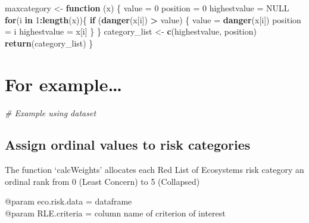 \documentclass[]{article}
\newenvironment{Shaded}{\begin{snugshade}}{\end{snugshade}}
\newcommand{\KeywordTok}[1]{\textcolor[rgb]{0.13,0.29,0.53}{\textbf{#1}}}
\newcommand{\DecValTok}[1]{\textcolor[rgb]{0.00,0.00,0.81}{#1}}
\newcommand{\StringTok}[1]{\textcolor[rgb]{0.31,0.60,0.02}{#1}}
\newcommand{\CommentTok}[1]{\textcolor[rgb]{0.56,0.35,0.01}{\textit{#1}}}
\newcommand{\OtherTok}[1]{\textcolor[rgb]{0.56,0.35,0.01}{#1}}
\newcommand{\ControlFlowTok}[1]{\textcolor[rgb]{0.13,0.29,0.53}{\textbf{#1}}}
\newcommand{\OperatorTok}[1]{\textcolor[rgb]{0.81,0.36,0.00}{\textbf{#1}}}
\newcommand{\NormalTok}[1]{#1}
\begin{document}
\begin{Shaded}
\begin{Highlighting}[]
\NormalTok{maxcategory <-}\StringTok{ }\ControlFlowTok{function}\NormalTok{ (x) \{}
\NormalTok{  value =}\StringTok{ }\DecValTok{0}
\NormalTok{  position =}\StringTok{ }\DecValTok{0}
\NormalTok{  highestvalue =}\StringTok{ }\OtherTok{NULL}
  \ControlFlowTok{for}\NormalTok{(i }\ControlFlowTok{in} \DecValTok{1}\OperatorTok{:}\KeywordTok{length}\NormalTok{(x))\{}
  \ControlFlowTok{if}\NormalTok{ (}\KeywordTok{danger}\NormalTok{(x[i]) }\OperatorTok{>}\StringTok{ }\NormalTok{value)}
\NormalTok{  \{}
\NormalTok{    value =}\StringTok{ }\KeywordTok{danger}\NormalTok{(x[i])}
\NormalTok{    position =}\StringTok{ }\NormalTok{i}
\NormalTok{    highestvalue =}\StringTok{ }\NormalTok{x[i]}
\NormalTok{  \}}
\NormalTok{  \}}
\NormalTok{  category_list <-}\StringTok{ }\KeywordTok{c}\NormalTok{(highestvalue, position)}
  \KeywordTok{return}\NormalTok{(category_list)}
\NormalTok{\}}
\end{Highlighting}
\end{Shaded}

\section{For example\ldots{}}\label{for-example}

\begin{Shaded}
\begin{Highlighting}[]
\CommentTok{# Example using dataset}
\end{Highlighting}
\end{Shaded}

\subsection{Assign ordinal values to risk
categories}\label{assign-ordinal-values-to-risk-categories}

The function `calcWeights' allocates each Red List of Ecosystems risk
category an ordinal rank from 0 (Least Concern) to 5 (Collapsed)

@param eco.risk.data = dataframe\\
@param RLE.criteria = column name of criterion of interest
\end{document}
